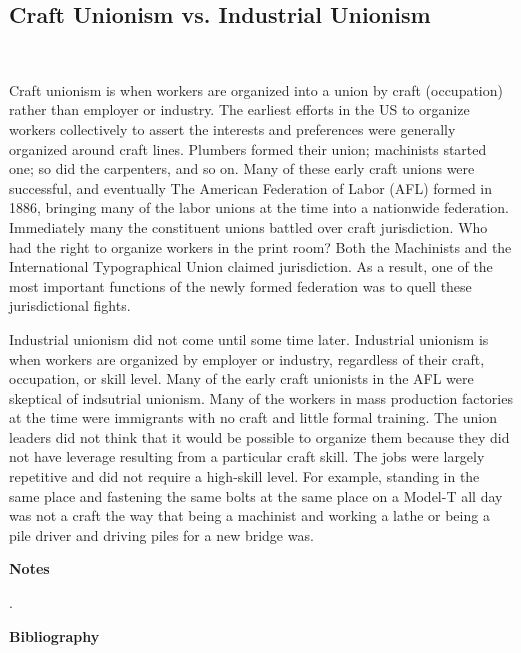 \subsection{Craft Unionism vs. Industrial Unionism} \

Craft unionism is when workers are organized into a union by craft (occupation) rather than employer or industry. The earliest efforts in the US to organize workers collectively to assert the interests and preferences were generally organized around craft lines. Plumbers formed their union; machinists started one; so did the carpenters, and so on. Many of these early craft unions were successful, and eventually The American Federation of Labor (AFL) formed in 1886, bringing many of the labor unions at the time into a nationwide federation. Immediately many the constituent unions battled over craft jurisdiction. Who had the right to organize workers in the print room? Both the Machinists and the International Typographical Union claimed jurisdiction. As a result, one of the most important functions of the newly formed federation was to quell these jurisdictional fights.

Industrial unionism did not come until some time later. Industrial unionism is when workers are organized by employer or industry, regardless of their craft, occupation, or skill level. Many of the early craft unionists in the AFL were skeptical of indsutrial unionism. Many of the workers in mass production factories at the time were immigrants with no craft and little formal training. The union leaders did not think that it would be possible to organize them because they did not have leverage resulting from a particular craft skill. The jobs were largely repetitive and did not require a high-skill level. For example, standing in the same place and fastening the same bolts at the same place on a Model-T all day was not a craft the way that being a machinist and working a lathe or being a pile driver and driving piles for a new bridge was.





\newpage
\begin{center}
{\bfseries Notes}
\end{center}

\noindent
.
\newpage
\begin{center}
{\bfseries Bibliography}
\end{center}



